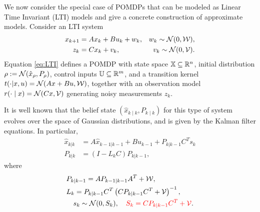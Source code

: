 \documentclass{ifacconf}
\newcommand{\red}[1]{{\color{red} #1}}
\newcommand{\new}[1]{{\color{blue}#1}}
\begin{document}
We now consider the special case of POMDPs that can be modeled as Linear Time Invariant (LTI) models and give a concrete construction of approximate models. Consider an LTI system
\begin{equation}
  \label{eq:LTI}
    \begin{aligned}
    x_{k+1}&=A x_{k} + B u_k+ w_k, & w_k\sim \mathcal N(0,\mathcal{W}), \\
    z_k&=Cx_k+v_k, & v_k\sim \mathcal N(0,\mathcal{V}).
  \end{aligned}
\end{equation}
Equation \eqref{eq:LTI} defines a \new{POMDP} with state space ${\mathbb{X}}\subseteq\mathbb R^n$, initial distribution $\rho:=\mathcal N(\hat x_\rho,P_\rho)$, control inputs ${\mathbb{U}} \subseteq \mathbb R^m$, and a transition kernel $t(\cdot | x, u ) = \mathcal N(Ax + Bu, \mathcal{W})$, together with an observation model $r(\cdot \mid x) = \mathcal N(Cx, \mathcal{V})$ generating noisy measurements $z_k$.

It is well known that the belief state $(\hat x_{k \mid k}, P_{k \mid k})$ for this type of system evolves over the space of Gaussian distributions, and is given by the Kalman filter equations. In particular,
\begin{align}
  \label{eq:beliefx} \hat x_{k|k}&=A\hat x_{k-1|k-1}+Bu_{k-1}+P_{k|k-1}C^Ts_k \\
  \label{eq:beliefP} P_{k|k}&= (I - L_k C) P_{k|k-1},
\end{align}
where
\begin{equation}
\begin{aligned}
  &P_{k|k-1}=AP_{k-1|k-1}A^T+\mathcal W, \\
  &L_k = P_{k|k-1}C^T\left(CP_{k|k-1}C^T+\mathcal V\right)^{-1}, \\
 &\quad s_k\sim \mathcal N (0, S_k ), \quad \red{S_k = CP_{k|k-1}C^T+\mathcal V} .
\end{aligned}
\end{equation}
\end{document}
